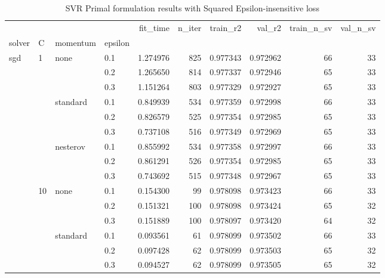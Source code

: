 \begin{table}[H]
\centering
\caption{SVR Primal formulation results with Squared Epsilon-insensitive loss}
\label{primal_svr_squared_eps_cv_results}
\begin{tabular}{llllrrrrrr}
\toprule
          &     &   &     &  fit\_time &  n\_iter &  train\_r2 &    val\_r2 &  train\_n\_sv &  val\_n\_sv \\
solver & C & momentum & epsilon &           &         &           &           &             &           \\
\midrule
sgd & 1   & none & 0.1 &  1.274976 &     825 &  0.977343 &  0.972962 &          66 &        33 \\
          &     &   & 0.2 &  1.265650 &     814 &  0.977337 &  0.972946 &          65 &        33 \\
          &     &   & 0.3 &  1.151264 &     803 &  0.977329 &  0.972927 &          65 &        33 \\
          &     & standard & 0.1 &  0.849939 &     534 &  0.977359 &  0.972998 &          66 &        33 \\
          &     &   & 0.2 &  0.826579 &     525 &  0.977354 &  0.972985 &          65 &        33 \\
          &     &   & 0.3 &  0.737108 &     516 &  0.977349 &  0.972969 &          65 &        33 \\
          &     & nesterov & 0.1 &  0.855992 &     534 &  0.977358 &  0.972997 &          66 &        33 \\
          &     &   & 0.2 &  0.861291 &     526 &  0.977354 &  0.972985 &          65 &        33 \\
          &     &   & 0.3 &  0.743692 &     515 &  0.977348 &  0.972967 &          65 &        33 \\
          & 10  & none & 0.1 &  0.154300 &      99 &  0.978098 &  0.973423 &          66 &        33 \\
          &     &   & 0.2 &  0.151321 &     100 &  0.978098 &  0.973424 &          65 &        32 \\
          &     &   & 0.3 &  0.151889 &     100 &  0.978097 &  0.973420 &          64 &        32 \\
          &     & standard & 0.1 &  0.093561 &      61 &  0.978099 &  0.973502 &          66 &        33 \\
          &     &   & 0.2 &  0.097428 &      62 &  0.978099 &  0.973503 &          65 &        32 \\
          &     &   & 0.3 &  0.094527 &      62 &  0.978099 &  0.973505 &          65 &        32 \\

\end{tabular}
\end{table}
